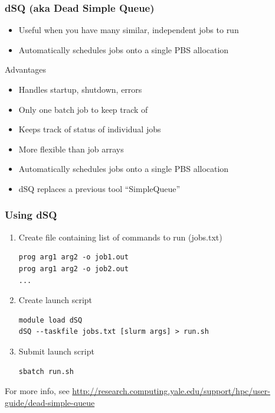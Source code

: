 \documentclass[10pt]{beamer}
\begin{document}
\begin{frame}[fragile]
\frametitle{dSQ (aka Dead Simple Queue)}

\begin{itemize}
\item Useful when you have many similar, independent jobs to run
\item Automatically schedules jobs onto a single PBS allocation
\end{itemize}

Advantages

\begin{itemize}
\item Handles startup, shutdown, errors
\item Only one batch job to keep track of
\item Keeps track of status of individual jobs
\item More flexible than job arrays
\item Automatically schedules jobs onto a single PBS allocation
\item dSQ replaces a previous tool ``SimpleQueue''
\end{itemize}

\end{frame}

\begin{frame}[fragile]
\frametitle{Using dSQ}

\begin{enumerate}
\item Create file containing list of commands to run (jobs.txt)
\begin{verbatim}
prog arg1 arg2 -o job1.out  
prog arg1 arg2 -o job2.out  
...
\end{verbatim}
\item Create launch script
\begin{verbatim}
module load dSQ
dSQ --taskfile jobs.txt [slurm args] > run.sh
\end{verbatim}

\item Submit launch script
\begin{verbatim}
sbatch run.sh  
\end{verbatim}
\end{enumerate}

For more info, see \url{http://research.computing.yale.edu/support/hpc/user-guide/dead-simple-queue}

\end{frame}
\end{document}
